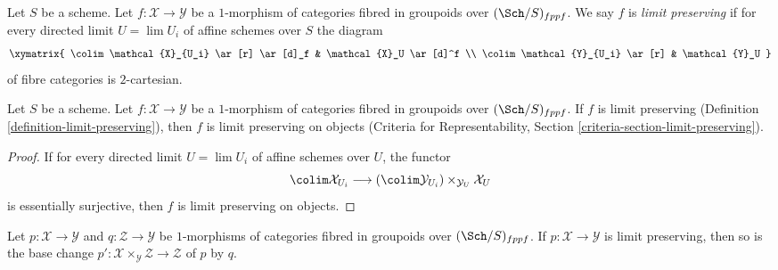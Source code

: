 \begin{definition}
\label{definition-limit-preserving}
Let $S$ be a scheme. Let $f : \mathcal{X} \to \mathcal{Y}$ be a
$1$-morphism of categories fibred in groupoids over $(\Sch/S)_{fppf}$.
We say $f$ is {\it limit preserving} if for every directed limit
$U = \lim U_i$ of affine schemes over $S$ the diagram
$$
\xymatrix{
\colim \mathcal{X}_{U_i} \ar[r] \ar[d]_f & \mathcal{X}_U \ar[d]^f \\
\colim \mathcal{Y}_{U_i} \ar[r] & \mathcal{Y}_U
}
$$
of fibre categories is $2$-cartesian.
\end{definition}

\begin{lemma}
\label{lemma-limit-preserving-objects}
Let $S$ be a scheme. Let $f : \mathcal{X} \to \mathcal{Y}$ be a
$1$-morphism of categories fibred in groupoids over $(\Sch/S)_{fppf}$.
If $f$ is limit preserving (Definition \ref{definition-limit-preserving}),
then $f$ is limit preserving on objects (Criteria for Representability, Section
\ref{criteria-section-limit-preserving}).
\end{lemma}

\begin{proof}
If for every directed limit $U = \lim U_i$ of affine schemes over $U$,
the functor
$$
\colim \mathcal{X}_{U_i} \longrightarrow
(\colim \mathcal{Y}_{U_i}) \times_{\mathcal{Y}_U} \mathcal{X}_U
$$
is essentially surjective, then $f$ is limit preserving on objects.
\end{proof}

\begin{lemma}
\label{lemma-base-change-limit-preserving}
Let $p : \mathcal{X} \to \mathcal{Y}$ and $q : \mathcal{Z} \to \mathcal{Y}$
be $1$-morphisms of categories fibred in groupoids over $(\Sch/S)_{fppf}$.
If $p : \mathcal{X} \to \mathcal{Y}$ is limit preserving, then so
is the base change
$p' : \mathcal{X} \times_\mathcal{Y} \mathcal{Z} \to \mathcal{Z}$
of $p$ by $q$.
\end{lemma}

